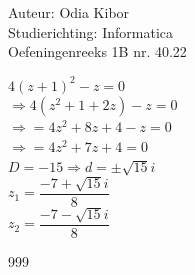 \documentclass[a4paper]{article}
\begin{document}
  
\noindent \large Auteur: Odia Kibor \\
\noindent \large Studierichting: Informatica\\
\noindent \large Oefeningenreeks 1B nr. 40.22\\

\medskip

\normalsize

$4(z + 1)^2 - z = 0$\\

$\Rightarrow 4(z^2 + 1 + 2z) - z = 0$\\

$\Rightarrow= 4z^2 + 8z + 4 - z = 0$\\

$\Rightarrow= 4z^2 + 7z + 4 = 0$\\

$D = -15 \Rightarrow d = \pm \sqrt{15}i$\\

$z_1 = \dfrac{-7 + \sqrt{15}i}{8}$\\

$z_2 = \dfrac{-7 - \sqrt{15}i}{8}$\\





\begin{thebibliography}{999}
\end{thebibliography}
\end{document}
